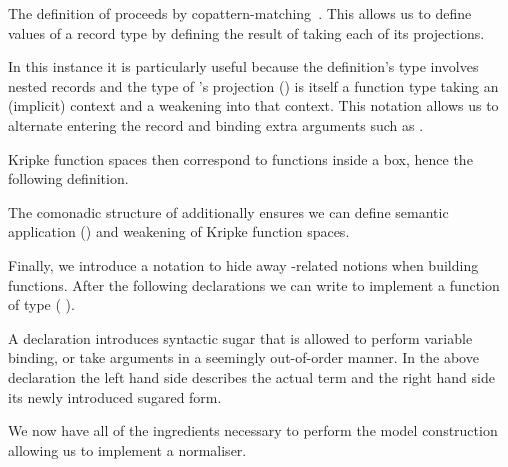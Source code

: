 
\begin{remark}
The definition of  proceeds by
copattern-matching~\cite{DBLP:conf/popl/AbelPTS13}.
This allows us to define values of a record type by defining
the result of taking each of its projections.

In this instance it is particularly useful because the
definition's type involves nested  records and
the type of 's projection () is itself
a function type taking an (implicit) context and a
weakening into that context.
This notation allows us to alternate entering the record
and binding extra arguments such as .
\end{remark}

Kripke function spaces then correspond to functions inside a box,
hence the following definition.


The comonadic structure of  additionally ensures we can define
semantic application (\AF{\_\$\$\_}) and weakening of Kripke function
spaces.


Finally, we introduce a notation to hide away -related
notions when building  functions.
%
After the following declarations we can write
\AIC{λλ[}  \AIC{,}  \AIC{]}  to implement a function of type
(   ).


\begin{remark}
  A  declaration introduces syntactic sugar that is
  allowed to perform variable binding, or take arguments in a
  seemingly out-of-order manner.
  In the above declaration the left hand side describes the
  actual term and the right hand side its newly introduced
  sugared form.
\end{remark}

We now have all of the ingredients necessary to perform the model
construction allowing us to implement a normaliser.

